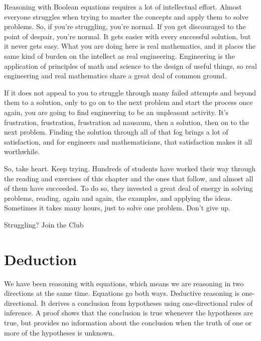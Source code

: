 \begin{aside}
Reasoning with Boolean equations requires a lot of intellectual effort.
Almost everyone struggles when trying to master the concepts
and apply them to solve problems.
So, if you're struggling, you're normal.
If you get discouraged to the point of despair, you're normal.
It gets easier with every successful solution, but it never gets easy.
What you are doing here is real mathematics, and it places the same
kind of burden on the intellect as real engineering.
Engineering is the application of principles
of math and science to the design of useful things,
so real engineering and real mathematics share a great deal of common ground.

If it does not appeal to you to struggle through many
failed attempts and beyond them to a solution, only to
go on to the next problem and start the process once again,
you are going to find engineering to be an unpleasant activity.
It's frustration, frustration, frustration
ad nausaum, then a solution, then on to the next problem.
Finding the solution through all of that fog
brings a lot of satisfaction, and for engineers and mathematicians,
that satisfaction makes it all worthwhile.

So, take heart. Keep trying.
Hundreds of students have worked their way through the reading
and exercises of this chapter and the ones that follow,
and almost all of them have succeeded.
To do so, they invested a great deal of energy in solving problems,
reading, again and again, the examples, and applying the ideas.
Sometimes it takes many hours, just to solve one problem.
Don't give up.

\caption{Struggling? Join the Club}
\label{aside:struggling}
\end{aside}

\section{Deduction}
\label{sec:deduction}

We have been reasoning with equations,
which means we are reasoning in two directions
at the same time. Equations go both ways.
Deductive reasoning is one-directional.
It derives a conclusion from hypotheses using one-directional rules of inference.
A proof shows that the conclusion is true whenever the hypotheses are true, but provides
no information about the conclusion when the truth of one or more of the hypotheses is
unknown.

